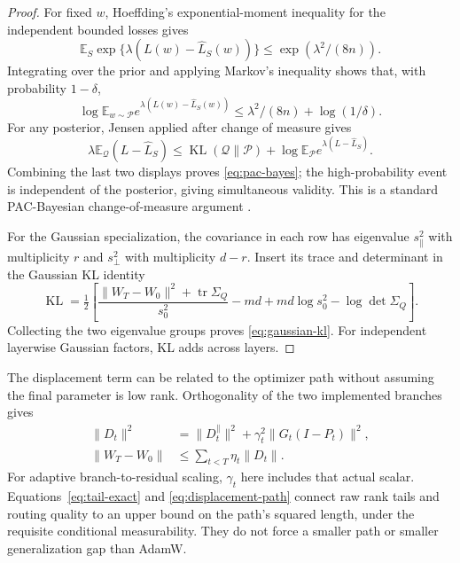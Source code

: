\begin{proof}
For fixed $w$, Hoeffding's exponential-moment inequality for the independent
bounded losses gives
\begin{equation}
 \mathbb E_S\exp\{\lambda(L(w)-\widehat L_S(w))\}
 \le\exp(\lambda^2/(8n)).
\end{equation}
Integrating over the prior and applying Markov's inequality shows that,
with probability $1-\delta$,
\begin{equation}
 \log\mathbb E_{w\sim\mathcal P}
       e^{\lambda(L(w)-\widehat L_S(w))}
 \le\lambda^2/(8n)+\log(1/\delta).
\end{equation}
For any posterior, Jensen applied after change of measure gives
\begin{equation}
 \lambda\mathbb E_{\mathcal Q}(L-\widehat L_S)
 \le\operatorname{KL}(\mathcal Q\|\mathcal P)
      +\log\mathbb E_{\mathcal P}e^{\lambda(L-\widehat L_S)}.
\end{equation}
Combining the last two displays proves \eqref{eq:pac-bayes}; the
high-probability event is independent of the posterior, giving simultaneous
validity. This is a standard PAC-Bayesian change-of-measure argument
\cite{mcallester1999pac,seeger2002pacbayes}.

For the Gaussian specialization, the covariance in each row has eigenvalue
$s_\parallel^2$ with multiplicity $r$ and $s_\perp^2$ with multiplicity
$d-r$. Insert its trace and determinant in the Gaussian KL identity
\begin{equation}
 \operatorname{KL}=\tfrac12\left[
 \frac{\|W_T-W_0\|^2+\operatorname{tr}\Sigma_Q}{s_0^2}
 -md+md\log s_0^2-\log\det\Sigma_Q\right].
\end{equation}
Collecting the two eigenvalue groups proves \eqref{eq:gaussian-kl}.
For independent layerwise Gaussian factors, KL adds across layers.
\end{proof}

The displacement term can be related to the optimizer path without
assuming the final parameter is low rank. Orthogonality of the two
implemented branches gives
\begin{align}
 \|D_t\|^2&=\|D_t^\parallel\|^2+
                  \gamma_t^2\|G_t(I-P_t)\|^2,\\
 \|W_T-W_0\|&\le\sum_{t<T}\eta_t\|D_t\|.
 \label{eq:displacement-path}
\end{align}
For adaptive branch-to-residual scaling, $\gamma_t$ here includes that
actual scalar. Equations~\eqref{eq:tail-exact} and
\eqref{eq:displacement-path} connect raw rank tails and routing quality
to an upper bound on the path's squared length, under the requisite
conditional measurability. They do not force a smaller path or smaller
generalization gap than AdamW.

